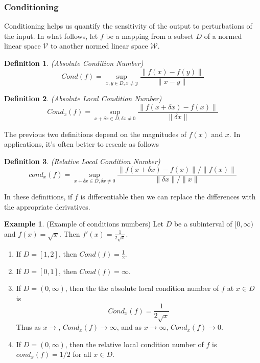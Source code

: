 \documentclass[12pt]{article}
\newtheorem{definition}{Definition}
\theoremstyle{definition}
\newtheorem{example}{Example}
\newcommand{\norm}[1]{\lVert#1\rVert}
\begin{document}
\subsubsection{Conditioning}
Conditioning helps us quantify the sensitivity of the output to perturbations of the input. In what follows, let $f$ be a mapping from a subset $D$ of a normed linear space $\mathcal{V}$ to another normed linear space $\mathcal{W}$. 
\begin{definition}(Absolute Condition Number)
\begin{equation}
	Cond(f) = \sup_{x,y \in D, x\neq y} \frac{\norm{f(x) - f(y)}}{\norm{x - y}}
\end{equation}
\end{definition}

\begin{definition}(Absolute Local Condition Number)
\begin{equation}
	Cond_x(f) = \sup_{x + \delta x \in D, \delta x \neq 0} \frac{\norm{f(x + \delta x) - f(x)}}{\norm{\delta x}}
\end{equation}
\end{definition}

The previous two definitions depend on the magnitudes of $f(x)$ and $x$. In applications, it's often better to rescale as follows
\begin{definition}(Relative Local Condition Number)
\begin{equation}
	cond_x(f) = \sup_{x + \delta x \in D, \delta x \neq 0} \frac{\norm{f(x + \delta x) - f(x)} / \norm{f(x)}}{\norm{\delta x} / \norm{x}}
\end{equation}
\end{definition}

In these definitions, if $f$ is differentiable then we can replace the differences with the appropriate derivatives. 

\begin{example}(Example of conditions numbers)
Let $D$ be a subinterval of $[0, \infty)$ and $f(x) = \sqrt{x}$. Then $f'(x) = \frac{1}{2 \sqrt{x}}$. 
\begin{enumerate}
	\item If $D = [1,2]$, then $Cond(f) = \frac{1}{2}$.
	\item If $D = [0, 1]$, then $Cond(f) = \infty$.
	\item If $D = (0, \infty)$, then the the absolute local condition number of $f$ at $x \in D$ is 
	\begin{equation}
		Cond_x(f) = \frac{1}{2 \sqrt{x}}
	\end{equation}
	Thus as $x \to $, $Cond_x(f) \to \infty$, and as $x \to \infty$, $Cond_x(f) \to 0$.
	\item If $D = (0, \infty)$, then the relative local condition number of $f$ is $cond_x(f) = 1/2$ for all $x \in D$. 
\end{enumerate}
\end{example}
\end{document}
